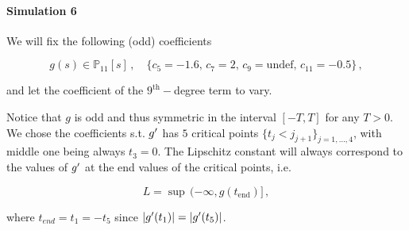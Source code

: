 \documentclass[../main.tex]{subfiles}
\begin{document}
\paragraph{Simulation 6}\label{par:sim_6}

We will fix the following (odd) coefficients

\begin{equation}\label{eq:sim_6_shift}
        g(s) \in \mathbb{P}_{11}[s]\,,\quad\{c_{5}=-1.6,\, c_{7}=2,\, c_{9}=\text{undef},\, c_{11}=-0.5\}\,,
\end{equation}

and let the coefficient of the $9^{\text{th}}-$degree term to vary.

Notice that $g$ is odd and thus symmetric in the interval $[-T,T]$ for any $T>0$.
We chose the coefficients s.t. $g'$ has $5$ critical points $\{t_{j}<j_{j+1}\}_{j=1,...,4}$, with middle one being always $t_{3}=0$.
The Lipschitz constant will always correspond to the values of $g'$ at the end values of the critical points, i.e.

\begin{equation*}
    L = \sup\,(-\infty, g(t_{\text{end}})]\,, 
\end{equation*}

where $t_{end}=t_{1}=-t_{5}$ since $|g'(t_{1})| = |g'(t_{5})|$.




\end{document}
